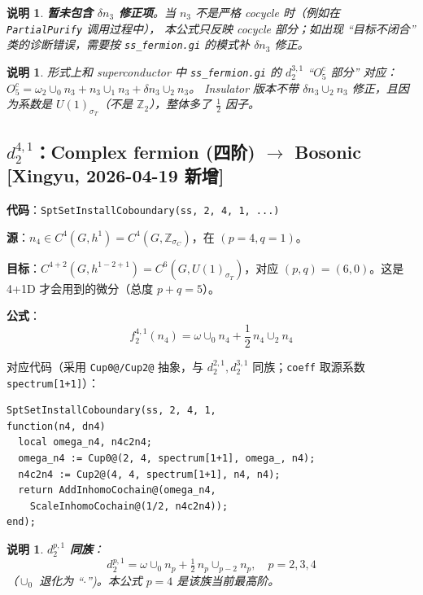 \documentclass[a4paper,fontset=ubuntu,12pt]{ctexart}
\newtheorem{remark}[definition]{说明}
\newcommand{\ZZ}{\mathbb{Z}}
\newcommand{\aT}{\sigma_T}
\newcommand{\aC}{\sigma_C}
\begin{document}
\begin{remark}
\textbf{暂未包含 $\delta n_3$ 修正项}。当 $n_3$ 不是严格 cocycle 时（例如在 \texttt{PartialPurify} 调用过程中），
本公式只反映 cocycle 部分；如出现 ``目标不闭合'' 类的诊断错误，需要按 \texttt{ss\_fermion.gi} 的模式补 $\delta n_3$ 修正。
\end{remark}

\begin{remark}
形式上和 superconductor 中 \texttt{ss\_fermion.gi} 的 $d_2^{3,1}$ ``$O_5^c$ 部分'' 对应：
$O_5^c = \omega_2 \cup_0 n_3 + n_3 \cup_1 n_3 + \delta n_3 \cup_2 n_3$。
Insulator 版本不带 $\delta n_3 \cup_2 n_3$ 修正，且因为系数是 $U(1)_{\aT}$（不是 $\ZZ_2$），整体多了 $\frac{1}{2}$ 因子。
\end{remark}

\subsection{\texorpdfstring{$d_2^{4,1}$}{d2(4,1)}：Complex fermion (四阶) $\to$ Bosonic \textmd{[Xingyu, 2026-04-19 新增]}}
\label{sec:d2-41}

\textbf{代码}：\texttt{SptSetInstallCoboundary(ss, 2, 4, 1, ...)}

\textbf{源}：$n_4 \in C^4(G, h^1) = C^4(G, \ZZ_{\aC})$，在 $(p = 4, q = 1)$。

\textbf{目标}：$C^{4+2}(G, h^{1-2+1}) = C^6(G, U(1)_{\aT})$，对应 $(p, q) = (6, 0)$。这是 4+1D 才会用到的微分（总度 $p+q = 5$）。

\textbf{公式}：
\begin{equation}
\label{eq:d2-41}
\boxed{f_2^{4,1}(n_4) = \omega \cup_0 n_4 + \frac{1}{2}\, n_4 \cup_2 n_4}
\end{equation}

对应代码（采用 \texttt{Cup0@/Cup2@} 抽象，与 $d_2^{2,1}, d_2^{3,1}$ 同族；\texttt{coeff} 取源系数 \texttt{spectrum[1+1]}）：
\begin{lstlisting}
SptSetInstallCoboundary(ss, 2, 4, 1,
function(n4, dn4)
  local omega_n4, n4c2n4;
  omega_n4 := Cup0@(2, 4, spectrum[1+1], omega_, n4);
  n4c2n4 := Cup2@(4, 4, spectrum[1+1], n4, n4);
  return AddInhomoCochain@(omega_n4,
    ScaleInhomoCochain@(1/2, n4c2n4));
end);
\end{lstlisting}

\begin{remark}
\textbf{$d_2^{p, 1}$ 同族}：
\[
d_2^{p, 1} = \omega \cup_0 n_p + \tfrac{1}{2}\, n_p \cup_{p-2} n_p, \quad p = 2, 3, 4
\]
（$\cup_0$ 退化为 ``$\cdot$'')。本公式 $p = 4$ 是该族当前最高阶。
\end{remark}
\end{document}
